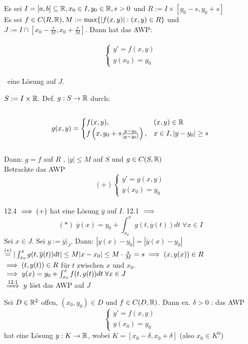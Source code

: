 \documentclass[a4paper,twoside,DIV15,BCOR12mm]{scrbook}
\begin{document}
\begin{satz}
Es sei $I = [a,b] \subseteq \mathbb{R}, x_0 \in I, y_0 \in \mathbb{R}, s > 0$ und $R:=I \times [y_0-s, y_0+s]$ \\
Es sei $f \in C(R,\mathbb{R}), M := \max \{ |f(x,y)| : (x,y) \in R \}$ und \\
$J := I \cap [x_0-\frac{s}{M},x_0+\frac{s}{M}].$ Dann hat das AWP:
\\\ $$\begin{cases} y' = f(x,y) \\ y(x_0) = y_0 \end{cases}$$ \\\ eine Lösung auf $J$.
\end{satz}

\begin{beweis}
$S := I \times \mathbb{R}.$ Def. $g: S \rightarrow \mathbb{R}$ durch: \\
\ $$ g(x,y) = \begin{cases} f(x,y), & (x,y) \in \mathbb{R} \\ f\left(x, y_0 + s \frac {y - y_0}{|y - y_0|}\right), & x \in I, |y - y_0| \geq s\end{cases}$$ \\
Dann: $g = f$ auf $R$ , $|g| \leq M$ auf $S$ und $g \in C(S,\mathbb{R})$ \\
Betrachte das AWP \\ $$(+)\begin{cases} y'= g(x,y) \\ y(x_0) = y_0 \end{cases}$$ \\
12.4 $\implies (+)$ hat eine Lösung $\overline{y}$ auf $I$. 12.1 $\implies$ \\
$$ (*) \; \overline{y}(x) = y_0 + \int_{x_0}^{x}g(t,\overline{y}(t)) dt \; \forall x \in I $$
Sei $x \in J.$ Sei $y := \overline{y}|_J.$ Dann: $|y(x) - y_0| = |\overline{y}(x) - y_0|$ \\
$\stackrel{(*)}{=} | \int_{x_0}^{x} g(t,\overline{y}(t)) dt | \leq M |x - x_0| \leq M \cdot \frac{s}{M} = s 
\implies (x,y(x)) \in R$ \\
$\implies (t,y(t)) \in R$ für $t$ zwischen $x$ und $x_0$. \\
$\implies y(x) = y_0 + \int_{x_0}^{x} f(t,g(t)) dt \; \forall x \in J$ \\
$\folgtnach{12.1} y$ löst das AWP auf $J$
\end{beweis}

\begin{satz}
Sei $D \in \mathbb{R}^{2}$ offen, $(x_0,y_0) \in D$ und $f \in C(D, \mathbb{R})$. Dann ex. $\delta > 0$ : das AWP
$$\begin{cases} y' = f(x,y) \\ y(x_0) = y_0 \end{cases}$$
hat eine Lösung $y: K \rightarrow \mathbb{R}$, wobei $K = [x_0 - \delta, x_0 + \delta]$ (also $x_0 \in K^{0}$)
\end{satz} 
\end{document}
